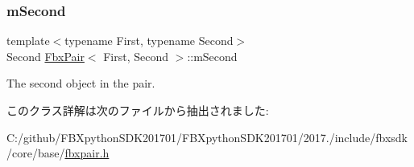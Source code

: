 \subsubsection{\texorpdfstring{m\+Second}{mSecond}}
{\footnotesize\ttfamily template$<$typename First, typename Second$>$ \\
Second \hyperlink{class_fbx_pair}{Fbx\+Pair}$<$ First, Second $>$\+::m\+Second}



The second object in the pair. 



このクラス詳解は次のファイルから抽出されました\+:\begin{DoxyCompactItemize}
\item 
C\+:/github/\+F\+B\+Xpython\+S\+D\+K201701/\+F\+B\+Xpython\+S\+D\+K201701/2017./include/fbxsdk/core/base/\hyperlink{fbxpair_8h}{fbxpair.\+h}\end{DoxyCompactItemize}

